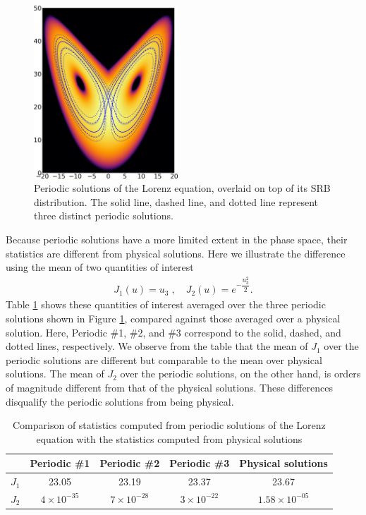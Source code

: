 \begin{figure}\centering
\includegraphics[width=0.48\textwidth]{lorenz_periodic.png}
\caption{Periodic solutions of the Lorenz equation, overlaid on top of
its SRB distribution.  The solid line, dashed line, and dotted line
represent three distinct periodic solutions.}
\label{fig:lorenz_periodic}
\end{figure}

Because periodic solutions have a more limited extent in the phase space, their
statistics are different from physical solutions.
Here we illustrate the difference using the mean of two
quantities of interest
\begin{align}
    J_1(u) = u_3\;,\quad J_2(u) = e^{-\dfrac{u_3^2}2}.
\end{align}
Table \ref{tab:lorenz_periodic_stats} shows these quantities
of interest averaged over the three periodic solutions shown in Figure
\ref{fig:lorenz_periodic}, compared against those averaged over a
physical solution.  Here, Periodic \#1, \#2, and \#3 correspond to
the solid, dashed, and dotted lines, respectively.
We observe from the table that the mean of $J_1$ over the periodic
solutions are different but comparable to the mean over physical solutions.  The mean of $J_2$ over the periodic solutions, on the other hand,
is orders of magnitude different from that of the physical solutions.
These differences disqualify the periodic solutions from being physical.
\begin{table}[H]
    \centering
    \begin{tabular}{c|c|c|c|c}
             & Periodic \#1 & Periodic \#2
             & Periodic \#3 & Physical solutions \\
    \hline
        $J_1$& 23.05 &
               23.19 &
               23.37 &
               23.67 \\
        $J_2$&$4\times 10^{-35}$&
              $7\times 10^{-28}$&
              $3\times 10^{-22}$&
              $1.58\times 10^{-05}$
    \end{tabular}
    \caption{Comparison of statistics computed from periodic solutions of the Lorenz equation with the statistics computed from physical solutions}
    \label{tab:lorenz_periodic_stats}
\end{table}

